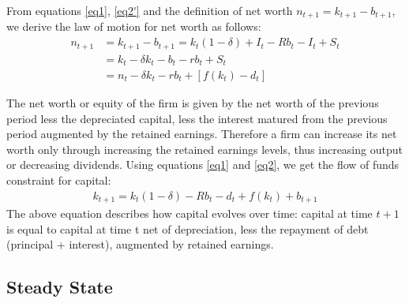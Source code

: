 \documentclass[12pt]{report}
\begin{document}
From equations \ref{eq1}, \ref{eq2'} and the definition of net worth \(n_{t+1}=k_{t+1}-b_{t+1}\), we derive the law of motion for net worth as follows:
\begin{align*}
    n_{t+1}&=k_{t+1}-b_{t+1} = k_{t}(1-\delta) + I_t - R b_{t} - I_t + S_{t} \\
    &= k_{t} - \delta k_{t} - b_{t} - r b_{t}+ S_t \\
    &= n_{t} - \delta k_{t} - r b_{t} + \left[f\left({k_t}\right) - d_t \right]
\end{align*}

The net worth or equity of the firm is given by the net worth of the previous period less the depreciated capital, less
the interest matured from the previous period augmented by the retained earnings. Therefore a firm can increase its
net worth only through increasing the retained earnings levels, thus increasing output or decreasing dividends.
Using equations \ref{eq1} and \ref{eq2}, we get the flow of funds constraint for capital:
\begin{align}
    k_{t+1}=k_{t}(1-\delta)- R b_{t} - d_t + f(k_{t})+b_{t+1} \label{eq3}
\end{align}
The above equation describes how capital evolves over time: capital at time \(t+1\) is equal to capital at time t
net of depreciation, less the repayment of debt (principal + interest), augmented by retained earnings. 

\subsection{Steady State}
\end{document}
